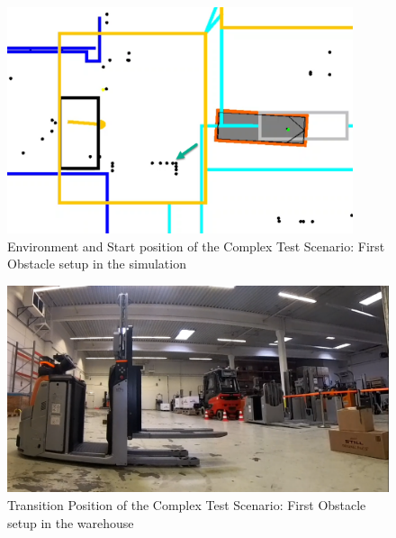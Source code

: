 \begin{figure}[H]
    \begin{center}
        \includegraphics[width=4in]{images/Chap3/Test2_ObsLeftVehic/Start_simu.png} %
        \caption{Environment and Start position of the Complex Test Scenario: First Obstacle setup in the simulation}
        \label{OptResult13}
        \end{center}    
\end{figure}

\begin{figure}[H]
    \begin{center}
        \includegraphics[width=5in]{images/Chap3/Test2_ObsLeftVehic/Transition_real.png} %
        \caption{Transition Position of the Complex Test Scenario: First Obstacle setup in the warehouse}
        \label{OptResult14}
        \end{center}    
\end{figure}

